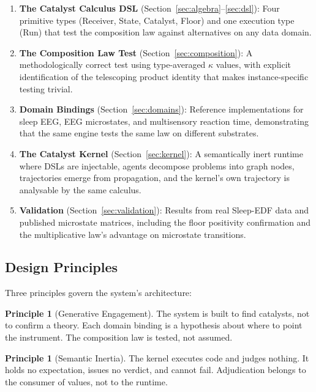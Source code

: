 \documentclass[11pt,a4paper]{article}
\theoremstyle{definition}
\newtheorem{principle}[theorem]{Principle}
\theoremstyle{remark}
\begin{document}
\begin{enumerate}[leftmargin=1.4em]
\item \textbf{The Catalyst Calculus DSL} (Section~\ref{sec:algebra}--\ref{sec:dsl}): Four primitive types (Receiver, State, Catalyst, Floor) and one execution type (Run) that test the composition law against alternatives on any data domain.

\item \textbf{The Composition Law Test} (Section~\ref{sec:composition}): A methodologically correct test using type-averaged $\kappa$ values, with explicit identification of the telescoping product identity that makes instance-specific testing trivial.

\item \textbf{Domain Bindings} (Section~\ref{sec:domains}): Reference implementations for sleep EEG, EEG microstates, and multisensory reaction time, demonstrating that the same engine tests the same law on different substrates.

\item \textbf{The Catalyst Kernel} (Section~\ref{sec:kernel}): A semantically inert runtime where DSLs are injectable, agents decompose problems into graph nodes, trajectories emerge from propagation, and the kernel's own trajectory is analysable by the same calculus.

\item \textbf{Validation} (Section~\ref{sec:validation}): Results from real Sleep-EDF data and published microstate matrices, including the floor positivity confirmation and the multiplicative law's advantage on microstate transitions.
\end{enumerate}

\subsection{Design Principles}

Three principles govern the system's architecture:

\begin{principle}[Generative Engagement]
The system is built to find catalysts, not to confirm a theory. Each domain binding is a hypothesis about where to point the instrument. The composition law is tested, not assumed.
\end{principle}

\begin{principle}[Semantic Inertia]
The kernel executes code and judges nothing. It holds no expectation, issues no verdict, and cannot fail. Adjudication belongs to the consumer of values, not to the runtime.
\end{principle}
\end{document}
